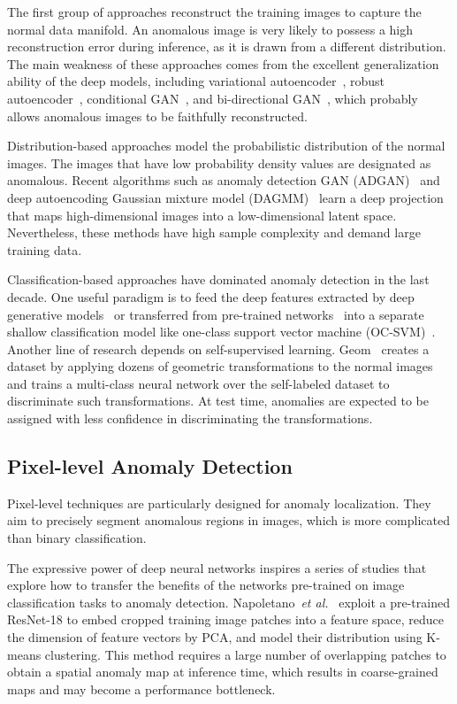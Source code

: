 \documentclass{bmvc2k}
\begin{document}
The first group of approaches reconstruct the training images to capture the normal data manifold. An anomalous image is very likely to possess a high reconstruction error during inference, as it is drawn from a different distribution. The main weakness of these approaches comes from the excellent generalization ability of the deep models, including variational autoencoder~\cite{An2015}, robust autoencoder~\cite{Zhou2017}, conditional GAN~\cite{Akcay2018}, and bi-directional GAN~\cite{Zenati2018},  which probably allows anomalous images to be faithfully reconstructed. 

Distribution-based approaches model the probabilistic distribution of the normal images. The images that have low probability density values are designated as anomalous. Recent algorithms such as anomaly detection GAN (ADGAN)~\cite{Deecke2018} and deep autoencoding Gaussian mixture model (DAGMM)~\cite{Zong2018} learn a deep projection that maps high-dimensional images into a low-dimensional latent space. Nevertheless, these methods have high sample complexity and demand large training data.

Classification-based approaches have dominated anomaly detection in the last decade. One useful paradigm is to feed the deep features extracted by deep generative models~\cite{Burlina2019} or transferred from pre-trained networks~\cite{Andrews2016,Erfani2016} into a separate shallow classification model like one-class support vector machine (OC-SVM)~\cite{Scholkopf2001}. Another line of research depends on self-supervised learning. Geom~\cite{Golan2018} creates a dataset by applying dozens of geometric transformations to the normal images and trains a multi-class neural network over the self-labeled dataset to discriminate such transformations. At test time, anomalies are expected to be assigned with less confidence in discriminating the transformations. 

\subsection{Pixel-level Anomaly Detection}
\label{sec2-sub2}

Pixel-level techniques are particularly designed for anomaly localization. They aim to precisely segment anomalous regions in images, which is more complicated than binary classification.

The expressive power of deep neural networks inspires a series of studies that explore how to transfer the benefits of the networks pre-trained on image classification tasks to anomaly detection. Napoletano~\textit{et al.}~\cite{Napoletano2018} exploit a pre-trained ResNet-18 to embed cropped training image patches into a feature space, reduce the dimension of feature vectors by PCA, and model their distribution using K-means clustering. This method requires a large number of overlapping patches to obtain a spatial anomaly map at inference time, which results in coarse-grained maps and may become a performance bottleneck.
\end{document}

